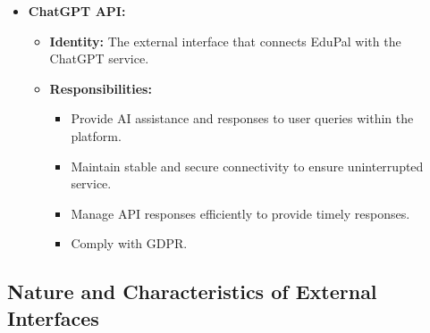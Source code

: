 \begin{itemize}
\begin{itemize}
          \end{itemize}
    \item \textbf{ChatGPT API:}
          \begin{itemize}
              \item \textbf{Identity:} The external interface that connects EduPal with the ChatGPT service.
              \item \textbf{Responsibilities:}
                    \begin{itemize}
                        \item Provide AI assistance and responses to user queries within the platform.
                        \item Maintain stable and secure connectivity to ensure uninterrupted service.
                        \item Manage API responses efficiently to provide timely responses.
                        \item Comply with GDPR.
                    \end{itemize}
          \end{itemize}
\end{itemize}


\subsection{Nature and Characteristics of External Interfaces}

